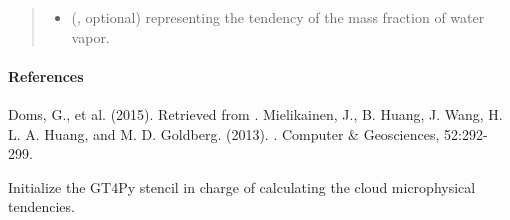 \documentclass[letterpaper,10pt,english]{sphinxmanual}
\begin{document}
\begin{fulllineitems}
\begin{fulllineitems}
\begin{quote}
\begin{description}
\begin{itemize}
\item {} 
 (, optional) \textendash{}  representing the tendency of the mass fraction of water vapor.

\end{itemize}


\end{description}\end{quote}
\paragraph{References}

Doms, G., et al. (2015).  Retrieved from .              Mielikainen, J., B. Huang, J. Wang, H. L. A. Huang, and M. D. Goldberg. (2013).                         . Computer \& Geosciences, 52:292-299.

\end{fulllineitems}


\begin{fulllineitems}
\label{\detokenize{api:tasmania.parameterizations.slow_tendency_microphysics_kessler_wrf.SlowTendencyMicrophysicsKesslerWRF._stencil_tendency_initialize}}
Initialize the GT4Py stencil in charge of calculating the cloud microphysical tendencies.

\end{fulllineitems}



\end{fulllineitems}
\end{document}
